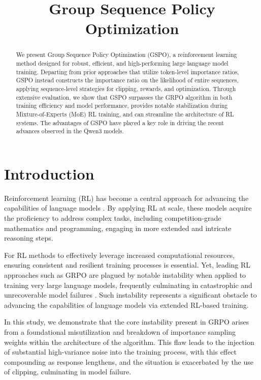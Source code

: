 \title{Group Sequence Policy Optimization}

\begin{abstract}
We present Group Sequence Policy Optimization (GSPO), a reinforcement learning method designed for robust, efficient, and high-performing large language model training. Departing from prior approaches that utilize token-level importance ratios, GSPO instead constructs the importance ratio on the likelihood of entire sequences, applying sequence-level strategies for clipping, rewards, and optimization. Through extensive evaluation, we show that GSPO surpasses the GRPO algorithm in both training efficiency and model performance, provides notable stabilization during Mixture-of-Experts (MoE) RL training, and can streamline the architecture of RL systems. The advantages of GSPO have played a key role in driving the recent advances observed in the Qwen3 models.
\end{abstract}

\section{Introduction}
\label{sec:intro}

Reinforcement learning (RL) has become a central approach for advancing the capabilities of language models \citep{o1,dpsk-r1,qwq32b,qwen3}. By applying RL at scale, these models acquire the proficiency to address complex tasks, including competition-grade mathematics and programming, engaging in more extended and intricate reasoning steps.

For RL methods to effectively leverage increased computational resources, ensuring consistent and resilient training processes is essential. Yet, leading RL approaches such as GRPO \citep{grpo} are plagued by notable instability when applied to training very large language models, frequently culminating in catastrophic and unrecoverable model failures \citep{qwen3, minimax-m1}. Such instability represents a significant obstacle to advancing the capabilities of language models via extended RL-based training.

In this study, we demonstrate that the core instability present in GRPO arises from a foundational misutilization and breakdown of importance sampling weights within the architecture of the algorithm. This flaw leads to the injection of substantial high-variance noise into the training process, with this effect compounding as response lengthens, and the situation is exacerbated by the use of clipping, culminating in model failure.

